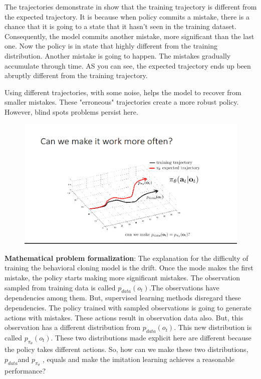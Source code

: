\documentclass[]{article}
\begin{document}
\par The trajectories demonstrate in  show that the training trajectory is different from
the expected trajectory. It is because when policy commits a mistake, there is a chance that it is going to a state that it
hasn't seen in the training dataset. Consequently, the model commits another mistake, more significant than the last one. Now the
policy is in state that highly different from the training distribution. Another mistake is going to happen. The mistakes
gradually accumulate through time. AS you can see, the expected trajectory ends up been abruptly different from
the training trajectory. 

\par
Using different trajectories, with some noise, helps the model to recover from smaller mistakes. 
These "erroneous" trajectories create a more robust policy.  However, blind spots problems persist here.

\begin{figure}
\begin{center}
    \includegraphics[scale=0.4]{cap2img/slide12.png}
\end{center}
\caption{}
\label{fig:formalization}
\end{figure}

\par \textbf{Mathematical problem formalization}: 
The explanation for the difficulty of training the behavioral cloning model is the drift. 
Once the mode makes the first mistake, the policy starts making more significant mistakes. The observation sampled from training data is
called $p_{data}(o_{t})$.The observations have dependencies among them. But, supervised learning methods disregard these dependencies. 
The policy trained with sampled observations is going to generate actions with mistakes. 
These actions result in observation data also. But, this observation has a different distribution from
$p_{data}(o_t)$. This new distribution is called $p_{\pi_{\theta}}(o_t)$. These two distributions made explicit here
are different because the policy takes different actions. So, how can we make these two distributions, $p_{data} $and
$p_{\pi_\theta}$ , equals and make the imitation learning achieves a reasonable performance? 
\end{document}
